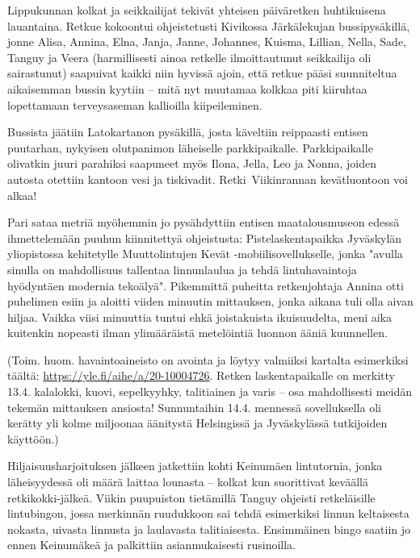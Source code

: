 \begin{multicols}{2}

	\noindent Lippukunnan kolkat ja seikkailijat tekivät yhteisen päiväretken
	huhtikuisena lauantaina. Retkue kokoontui ohjeistetusti Kivikossa
	Järkälekujan bussipysäkillä, jonne Alisa, Annina, Elna, Janja, Janne,
	Johannes, Kuisma, Lillian, Nella, Sade, Tanguy ja Veera (harmillisesti
	ainoa retkelle ilmoittautunut seikkailija oli sairastunut) saapuivat
	kaikki niin hyvissä ajoin, että retkue pääsi suunniteltua aikaisemman
	bussin kyytiin – mitä nyt muutamaa kolkkaa piti kiiruhtaa lopettamaan
	terveysaseman kallioilla kiipeileminen.

	Bussista jäätiin Latokartanon pysäkillä, josta käveltiin reippaasti
	entisen puutarhan, nykyisen olutpanimon läheiselle parkkipaikalle.
	Parkkipaikalle olivatkin juuri parahiksi saapuneet myös Ilona, Jella,
	Leo ja Nonna, joiden autosta otettiin kantoon vesi ja tiskivadit.
	\mbox{Retki Viikinrannan} kevätluontoon voi \mbox{alkaa!}

	Pari sataa metriä myöhemmin jo pysähdyttiin entisen maatalousmuseon
	edessä ihmettelemään puuhun kiinnitettyä ohjeistusta:
	Pistelaskentapaikka Jyväskylän yliopistossa kehitetylle Muuttolintujen
	Kevät -mobiilisovellukselle, jonka "avulla sinulla on mahdollisuus
	tallentaa linnunlaulua ja tehdä lintuhavaintoja hyödyntäen modernia
	tekoälyä". Pikemmittä puheitta retkenjohtaja Annina otti puhelimen
	esiin ja aloitti viiden minuutin mittauksen, jonka aikana tuli olla
	aivan hiljaa. Vaikka viisi minuuttia tuntui ehkä joistakuista
	ikuisuudelta, meni aika kuitenkin nopeasti ilman ylimääräistä
	metelöintiä luonnon ääniä kuunnellen.

	\columnbreak

	(Toim. huom. havaintoaineisto on avointa ja löytyy valmiiksi kartalta
	esimerkiksi täältä:
	\href{https://yle.fi/aihe/a/20-10004726}{https://yle.fi/aihe/a/20-10004726}.
	Retken laskentapaikalle on merkitty 13.4. kalalokki, kuovi,
	sepelkyyhky, talitiainen ja varis – osa mahdollisesti meidän tekemän
	mittauksen ansiosta! Sunnuntaihin 14.4. mennessä sovelluksella oli
	kerätty yli kolme miljoonaa äänitystä Helsingissä ja Jyväskylässä
	tutkijoiden käyttöön.)

	Hiljaisuusharjoituksen jälkeen jatkettiin kohti Keinumäen lintutornia,
	jonka läheisyydessä oli määrä laittaa lounasta – kolkat kun suorittivat
	keväällä retkikokki-jälkeä. Viikin puupuiston tietämillä Tanguy
	ohjeisti retkeläisille lintubingon, jossa merkinnän ruudukkoon sai
	tehdä esimerkiksi linnun keltaisesta nokasta, uivasta linnusta ja
	laulavasta talitiaisesta. Ensimmäinen bingo saatiin jo ennen Keinumäkeä
	ja palkittiin asianmukaisesti rusinoilla.


\end{multicols}

